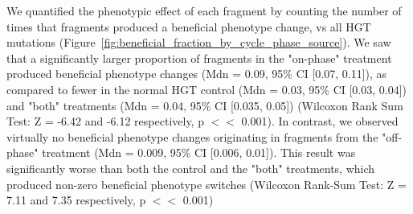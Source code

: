 \documentclass[PhD]{msu-thesis}
\begin{document}
We quantified the phenotypic effect of each fragment by counting the number of times that fragments produced a beneficial phenotype change, vs all HGT mutations (Figure~\ref{fig:beneficial_fraction_by_cycle_phase_source}). We saw that a significantly larger proportion of fragments in the "on-phase" treatment produced beneficial phenotype changes (Mdn = 0.09, 95\% CI [0.07, 0.11]), as compared to fewer in the normal HGT control (Mdn = 0.03, 95\% CI [0.03, 0.04]) and "both" treatments (Mdn = 0.04, 95\% CI [0.035, 0.05]) (Wilcoxon Rank Sum Test: Z = -6.42 and -6.12 respectively, p $<<$ 0.001). In contrast, we observed virtually no beneficial phenotype changes originating in fragments from the "off-phase" treatment (Mdn = 0.009, 95\% CI [0.006, 0.01]). This result was significantly worse than both the control and the "both" treatments, which produced non-zero beneficial phenotype switches (Wilcoxon Rank-Sum Test: Z = 7.11 and 7.35 respectively, p $<<$ 0.001) 
\end{document}
